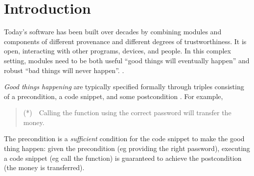 

\section{Introduction}
\label{s:intro}

Today's   software has been built 
over decades by combining modules and components of
different provenance and different degrees of trustworthiness. It 
is open, interacting with other programs, devices, and people.
In this complex setting, modules need to be both useful ``good things
will eventually happen'' and robust 
``bad things will never happen''. %
\cite{Lamport77}. 
 
  \vspace{.03in}
\emph{Good things happening} are typically specified formally 
 through triples consisting of a  precondition, a code snippet, and some
 postcondition \cite{Hoare69}.
 For example,
 \begin{quote}
(*)\  \ Calling the  function  using the correct 
 password will transfer the money.
\end{quote}
  The precondition is a \emph{sufficient} condition for the code snippet to
make the good thing happen: given the precondition (eg providing the right 
password), executing a
code snippet (eg call  the  function) 
is guaranteed to achieve the postcondition (the money is transferred).


